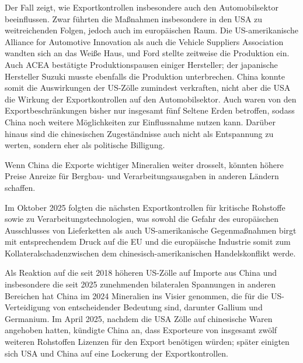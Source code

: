 \documentclass[12pt,a4paper,oneside]{book} %
\begin{document}
Der Fall zeigt, wie Exportkontrollen insbesondere auch den Automobilsektor beeinflussen. Zwar führten die  Maßnahmen insbesondere in den USA zu weitreichenden Folgen, jedoch auch im europäischen Raum. Die US-amerikanische Alliance for Automotive Innovation als auch die Vehicle Suppliers Association wandten sich an das Weiße Haus, und Ford stellte zeitweise die Produktion ein. Auch ACEA bestätigte Produktionspausen einiger Hersteller; der japanische Hersteller Suzuki musste ebenfalls die Produktion unterbrechen. China konnte somit die Auswirkungen der US-Zölle zumindest verkraften, nicht aber die USA die Wirkung der Exportkontrollen auf den Automobilsektor. Auch waren von den Exportbeschränkungen bisher nur insgesamt fünf Seltene Erden betroffen, sodass China noch weitere Möglichkeiten zur Einflussnahme nutzen kann. Darüber hinaus sind die chinesischen Zugeständnisse auch nicht als Entspannung zu werten, sondern eher als politische Billigung.

Wenn China die Exporte wichtiger Mineralien weiter drosselt, könnten höhere Preise Anreize für Bergbau- und Verarbeitungsausgaben in anderen Ländern schaffen.

Im Oktober 2025 folgten die nächsten Exportkontrollen für kritische Rohstoffe sowie zu Verarbeitungstechnologien, was sowohl die Gefahr des europäischen Ausschlusses von Lieferketten als auch US-amerikanische Gegenmaßnahmen birgt mit entsprechendem Druck auf die EU und die europäische Industrie somit zum \glqq Kollateralschaden\grqq zwischen dem chinesisch-amerikanischen Handelskonflikt werde.\autocite{Handelsblatt Vela}

Als Reaktion auf die seit 2018 höheren US-Zölle auf Importe aus China und insbesondere die seit 2025 zunehmenden bilateralen Spannungen in anderen Bereichen hat China im 2024 Mineralien ins Visier genommen, die für die US-Verteidigung von entscheidender Bedeutung sind, darunter Gallium und Germanium. Im April 2025, nachdem die USA Zölle auf chinesische Waren angehoben hatten, kündigte China an, dass Exporteure von insgesamt zwölf weiteren Rohstoffen Lizenzen für den Export benötigen würden; später einigten sich USA und China auf eine Lockerung der Exportkontrollen.
\end{document}
